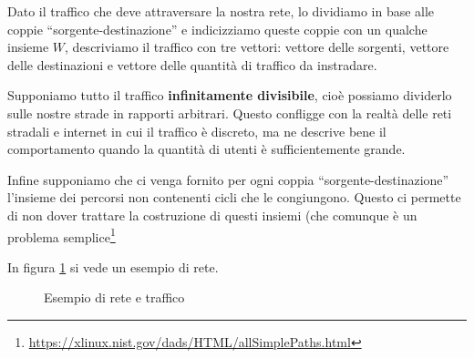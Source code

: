 \documentclass[a4paper]{article}
\theoremstyle{plain}
\theoremstyle{definition}
\theoremstyle{remark}
\begin{document}
Dato il traffico che deve attraversare la nostra rete, lo dividiamo in
base alle coppie ``sorgente-destinazione'' e indicizziamo queste
coppie con un qualche insieme $W$, descriviamo il traffico con tre
vettori: vettore delle sorgenti, vettore delle destinazioni e vettore
delle quantità di traffico da instradare.

Supponiamo tutto il traffico \textbf{infinitamente divisibile}, cioè
possiamo dividerlo sulle nostre strade in rapporti arbitrari. Questo
confligge con la realtà delle reti stradali e internet in cui il
traffico è discreto, ma ne descrive bene il comportamento quando la
quantità di utenti è sufficientemente grande.

Infine supponiamo che ci venga fornito per ogni coppia
``sorgente-destinazione'' l'insieme dei percorsi non contenenti cicli
che le congiungono. Questo ci permette di non dover trattare la
costruzione di questi insiemi (che comunque è un problema
semplice\footnote{\url{https://xlinux.nist.gov/dads/HTML/allSimplePaths.html}}

In figura \ref{fig:esempio-rete} si vede un esempio di rete.

\begin{figure}[h]
  \caption{Esempio di rete e traffico}
  \label{fig:esempio-rete}
\end{figure}
\end{document}
